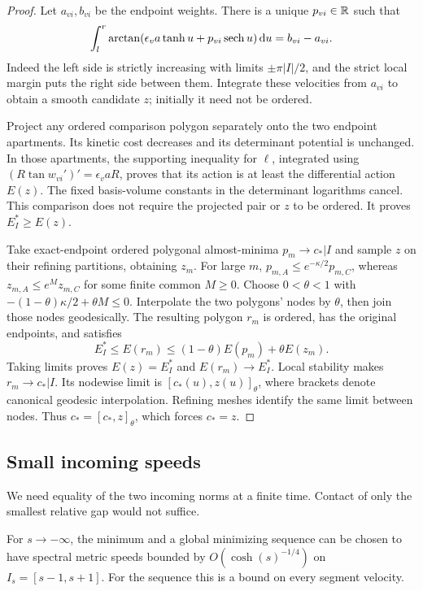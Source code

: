 \begin{proof}
Let $a_{vi},b_{vi}$ be the endpoint weights. There is a unique
$p_{vi}\in\mathbb R$ such that
\[
 \int_l^r\arctan(\epsilon_v a\tanh u+p_{vi}\operatorname{sech} u)\,\mathrm d u
       =b_{vi}-a_{vi}.
\]
Indeed the left side is strictly increasing with limits
$\pm\pi|I|/2$, and the strict local margin puts the right side
between them. Integrate these velocities from $a_{vi}$ to obtain
a smooth candidate $z$; initially it need not be ordered.

Project any ordered comparison polygon separately onto the two
endpoint apartments. Its kinetic cost decreases and its determinant
potential is unchanged. In those apartments, the supporting
inequality for $\ell$, integrated using
$(R\tan w_{vi}')'=\epsilon_v aR$, proves that its action is at
least the differential action $E(z)$. The fixed basis-volume
constants in the determinant logarithms cancel. This comparison
does not require the projected pair or $z$ to be ordered.
It proves $E_I^*\ge E(z)$.

Take exact-endpoint ordered polygonal almost-minima $p_m\to c_*|I$
and sample $z$ on their refining partitions, obtaining $z_m$.
For large $m$, $p_{m,A}\le e^{-\kappa/2}p_{m,C}$, whereas
$z_{m,A}\le e^M z_{m,C}$ for some finite common $M\ge0$.
Choose $0<\theta<1$ with
$-(1-\theta)\kappa/2+\theta M\le0$. Interpolate the two
polygons' nodes by $\theta$, then join those nodes geodesically.
The resulting polygon $r_m$ is ordered, has the original endpoints,
and satisfies
\[
 E_I^*\le E(r_m)\le(1-\theta)E(p_m)+\theta E(z_m).
\]
Taking limits proves $E(z)=E_I^*$ and $E(r_m)\to E_I^*$.
Local stability makes $r_m\to c_*|I$. Its nodewise limit is
$[c_*(u),z(u)]_\theta$, where brackets denote canonical geodesic
interpolation. Refining meshes identify the same limit between
nodes. Thus $c_*=[c_*,z]_\theta$, which forces $c_*=z$.
\end{proof}

\subsection{Small incoming speeds}
We need equality of the two incoming norms at a finite time.
Contact of only the smallest relative gap would not suffice.

\begin{lemma}\label{lem:smallincoming}
For $s\to-\infty$, the minimum and a global minimizing sequence
can be chosen to have spectral metric speeds bounded by
$O(\cosh(s)^{-1/4})$ on $I_s=[s-1,s+1]$.
For the sequence this is a bound on every segment velocity.
\end{lemma}

